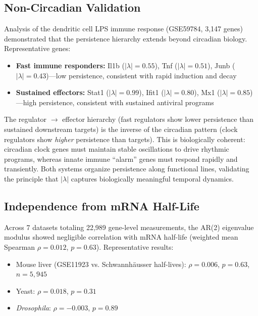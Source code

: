 \documentclass[11pt,letterpaper]{article}
\begin{document}
\subsection{Non-Circadian Validation}
\label{sec:noncircadian-results}

Analysis of the dendritic cell LPS immune response (GSE59784, 3,147 genes) demonstrated that the persistence hierarchy extends beyond circadian biology. Representative genes:

\begin{itemize}
\item \textbf{Fast immune responders:} Il1b ($|\lambda| = 0.55$), Tnf ($|\lambda| = 0.51$), Junb ($|\lambda| = 0.43$)---low persistence, consistent with rapid induction and decay
\item \textbf{Sustained effectors:} Stat1 ($|\lambda| = 0.99$), Ifit1 ($|\lambda| = 0.80$), Mx1 ($|\lambda| = 0.85$)---high persistence, consistent with sustained antiviral programs
\end{itemize}

The regulator $\rightarrow$ effector hierarchy (fast regulators show lower persistence than sustained downstream targets) is the inverse of the circadian pattern (clock regulators show \textit{higher} persistence than targets). This is biologically coherent: circadian clock genes must maintain stable oscillations to drive rhythmic programs, whereas innate immune ``alarm'' genes must respond rapidly and transiently. Both systems organize persistence along functional lines, validating the principle that $|\lambda|$ captures biologically meaningful temporal dynamics.

\subsection{Independence from mRNA Half-Life}
\label{sec:halflife-results}

Across 7 datasets totaling 22,989 gene-level measurements, the AR(2) eigenvalue modulus showed negligible correlation with mRNA half-life (weighted mean Spearman $\rho = 0.012$, $p = 0.63$). Representative results:
\begin{itemize}
\item Mouse liver (GSE11923 vs. Schwannh\"{a}usser half-lives): $\rho = 0.006$, $p = 0.63$, $n = 5{,}945$
\item Yeast: $\rho = 0.018$, $p = 0.31$
\item \textit{Drosophila}: $\rho = -0.003$, $p = 0.89$
\end{itemize}
\end{document}

